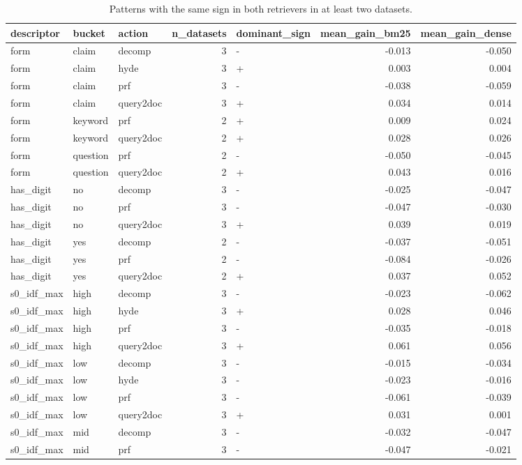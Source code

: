 \begin{table}
\caption{Patterns with the same sign in both retrievers in at least two datasets.}
\label{tab:b-cons}
\begin{tabular}{lllrlrr}
\toprule
descriptor & bucket & action & n\_datasets & dominant\_sign & mean\_gain\_bm25 & mean\_gain\_dense \\
\midrule
form & claim & decomp & 3 & - & -0.013 & -0.050 \\
form & claim & hyde & 3 & + & 0.003 & 0.004 \\
form & claim & prf & 3 & - & -0.038 & -0.059 \\
form & claim & query2doc & 3 & + & 0.034 & 0.014 \\
form & keyword & prf & 2 & + & 0.009 & 0.024 \\
form & keyword & query2doc & 2 & + & 0.028 & 0.026 \\
form & question & prf & 2 & - & -0.050 & -0.045 \\
form & question & query2doc & 2 & + & 0.043 & 0.016 \\
has\_digit & no & decomp & 3 & - & -0.025 & -0.047 \\
has\_digit & no & prf & 3 & - & -0.047 & -0.030 \\
has\_digit & no & query2doc & 3 & + & 0.039 & 0.019 \\
has\_digit & yes & decomp & 2 & - & -0.037 & -0.051 \\
has\_digit & yes & prf & 2 & - & -0.084 & -0.026 \\
has\_digit & yes & query2doc & 2 & + & 0.037 & 0.052 \\
s0\_idf\_max & high & decomp & 3 & - & -0.023 & -0.062 \\
s0\_idf\_max & high & hyde & 3 & + & 0.028 & 0.046 \\
s0\_idf\_max & high & prf & 3 & - & -0.035 & -0.018 \\
s0\_idf\_max & high & query2doc & 3 & + & 0.061 & 0.056 \\
s0\_idf\_max & low & decomp & 3 & - & -0.015 & -0.034 \\
s0\_idf\_max & low & hyde & 3 & - & -0.023 & -0.016 \\
s0\_idf\_max & low & prf & 3 & - & -0.061 & -0.039 \\
s0\_idf\_max & low & query2doc & 3 & + & 0.031 & 0.001 \\
s0\_idf\_max & mid & decomp & 3 & - & -0.032 & -0.047 \\
s0\_idf\_max & mid & prf & 3 & - & -0.047 & -0.021 \\

\end{tabular}
\end{table}
